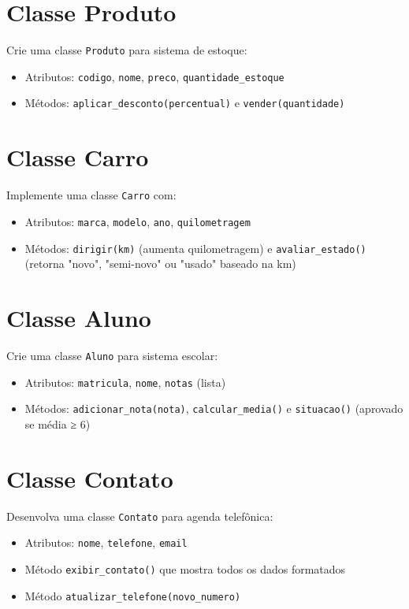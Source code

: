 \section{Classe Produto}
Crie uma classe \texttt{Produto} para sistema de estoque:
\begin{itemize}
\item Atributos: \texttt{codigo}, \texttt{nome}, \texttt{preco}, \texttt{quantidade\_estoque}
\item Métodos: \texttt{aplicar\_desconto(percentual)} e \texttt{vender(quantidade)}
\end{itemize}

\section{Classe Carro}
Implemente uma classe \texttt{Carro} com:
\begin{itemize}
\item Atributos: \texttt{marca}, \texttt{modelo}, \texttt{ano}, \texttt{quilometragem}
\item Métodos: \texttt{dirigir(km)} (aumenta quilometragem) e \texttt{avaliar\_estado()} (retorna "novo", "semi-novo" ou "usado" baseado na km)
\end{itemize}

\section{Classe Aluno}
Crie uma classe \texttt{Aluno} para sistema escolar:
\begin{itemize}
\item Atributos: \texttt{matricula}, \texttt{nome}, \texttt{notas} (lista)
\item Métodos: \texttt{adicionar\_nota(nota)}, \texttt{calcular\_media()} e \texttt{situacao()} (aprovado se média ≥ 6)
\end{itemize}

\section{Classe Contato}
Desenvolva uma classe \texttt{Contato} para agenda telefônica:
\begin{itemize}
\item Atributos: \texttt{nome}, \texttt{telefone}, \texttt{email}
\item Método \texttt{exibir\_contato()} que mostra todos os dados formatados
\item Método \texttt{atualizar\_telefone(novo\_numero)}
\end{itemize}

